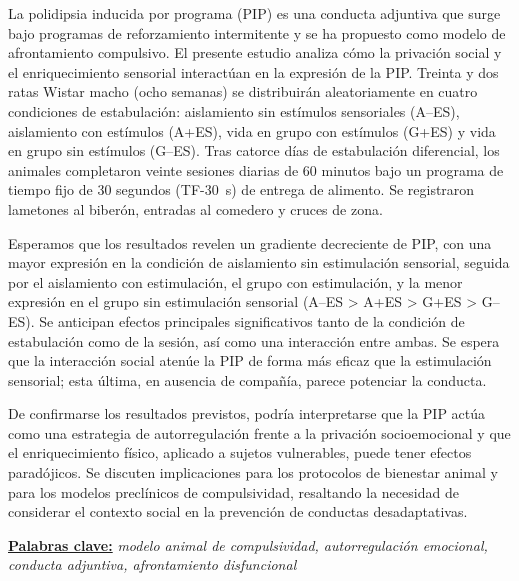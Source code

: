 \documentclass[12pt,a4paper]{article}
\begin{document}
    \begin{center}
    \begin{minipage}{0.9\textwidth}
    \noindent
    La polidipsia inducida por programa (PIP) es una conducta adjuntiva que surge bajo programas de reforzamiento intermitente y se ha propuesto como modelo de afrontamiento compulsivo. El presente estudio analiza cómo la privación social y el enriquecimiento sensorial interactúan en la expresión de la PIP. Treinta y dos ratas Wistar macho (ocho semanas) se distribuirán aleatoriamente en cuatro condiciones de estabulación: aislamiento sin estímulos sensoriales (A--ES), aislamiento con estímulos (A+ES), vida en grupo con estímulos (G+ES) y vida en grupo sin estímulos (G--ES). Tras catorce días de estabulación diferencial, los animales completaron veinte sesiones diarias de 60 minutos bajo un programa de tiempo fijo de 30 segundos (TF-30~s) de entrega de alimento. Se registraron lametones al biberón, entradas al comedero y cruces de zona.
    
    Esperamos que los resultados revelen un gradiente decreciente de PIP, con una mayor expresión en la condición de aislamiento sin estimulación sensorial, seguida por el aislamiento con estimulación, el grupo con estimulación, y la menor expresión en el grupo sin estimulación sensorial (A--ES > A+ES > G+ES > G--ES). Se anticipan efectos principales significativos tanto de la condición de estabulación como de la sesión, así como una interacción entre ambas. Se espera que la interacción social atenúe la PIP de forma más eficaz que la estimulación sensorial; esta última, en ausencia de compañía, parece potenciar la conducta.

    De confirmarse los resultados previstos, podría interpretarse que la PIP actúa como una estrategia de autorregulación frente a la privación socioemocional y que el enriquecimiento físico, aplicado a sujetos vulnerables, puede tener efectos paradójicos. Se discuten implicaciones para los protocolos de bienestar animal y para los modelos preclínicos de compulsividad, resaltando la necesidad de considerar el contexto social en la prevención de conductas desadaptativas.
    
    \vspace{2mm}
    \noindent
    \underline{\textbf{Palabras clave:}} \textit{modelo animal de compulsividad, autorregulación emocional, conducta adjuntiva, afrontamiento disfuncional}
    \end{minipage}
    \end{center}
    
\end{document}
